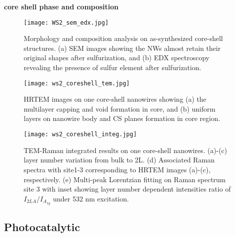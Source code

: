 \documentclass[11pt]{article} %
\providecommand*{\bibpath}{E:/spring2012/Ubuntu/Latex/Mendeley_Bib_lib}
\begin{document}
\textbf{core shell phase and composition}

\begin{figure}[htb]
\centering
\texttt{[image: WS2\_sem\_edx.jpg]}
\caption{ Morphology and composition analysis on as-synthesized core-shell structures. (a) SEM images showing the NWs almost retain their original shapes after sulfurization, and (b) EDX spectroscopy revealing the presence of sulfur element after sulfurization.}
\label{fig:ws2sem}
\end{figure}

\begin{figure}[htb]
\centering
\texttt{[image: ws2\_coreshell\_tem.jpg]}
\caption{HRTEM images on one core-shell nanowires showing (a) the multilayer capping and void formation in  core, and (b) uniform  layers on nanowire body and CS planes formation in core region.}
\label{fig:ws2tem}
\end{figure}
\begin{figure}[htb]
\centering
\texttt{[image: ws2\_coreshell\_integ.jpg]}
\caption{TEM-Raman integrated results on one core-shell nanowires. (a)-(c)  layer number variation from bulk to 2L. (d) Associated Raman spectra with site1-3 corresponding to HRTEM images (a)-(c), respectively. (e) Multi-peak Lorentzian fitting on Raman spectrum site 3 with inset showing layer number dependent intensities ratio of $I_{2LA}/I_{A_{1g}}$ under 532 nm excitation.}
\label{fig:ws2ram}
\end{figure}


\FloatBarrier
\subsection{Photocatalytic}



\clearpage


\end{document}

